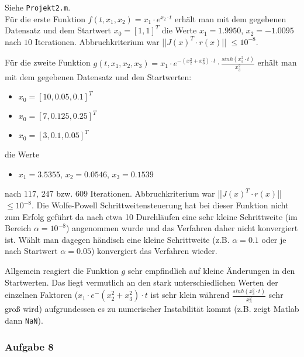 \documentclass[a4paper, 12pt]{report}
\begin{document}
Siehe \lstinline[basicstyle=\ttfamily\color{black}]|Projekt2.m|.\\
Für die erste Funktion $f(t, x_1, x_2) = x_1\cdot e^{x_2\cdot t}$ erhält man mit dem gegebenen Datensatz und dem
Startwert $x_0 = [1, 1]^T$ die Werte $x_1 = 1.9950$, $x_2 = -1.0095$ nach $10$ Iterationen. Abbruchkriterium war
||$J(x)^T\cdot r(x)$|| $ \leq 10^{-8}$.\par
Für die zweite Funktion $g(t, x_1, x_2, x_3) = x_1 \cdot e^{ -(x_2^2 + x_3^2)\cdot t }\cdot \frac{sinh(x_3^2\cdot t)}{x_3^2}$
erhält man mit dem gegebenen Datensatz und den Startwerten:
\begin{itemize}
  \item $x_0 = [10, 0.05, 0.1]^T$
  \item $x_0 = [7, 0.125, 0.25]^T$
  \item $x_0 = [3, 0.1, 0.05]^T$
\end{itemize}
die Werte
\begin{itemize}
  \item $x_1 = 3.5355$, $x_2 = 0.0546$, $x_3 = 0.1539$
\end{itemize}
nach $117$, $247$ bzw. $609$ Iterationen. Abbruchkriterium war ||$J(x)^T\cdot r(x)$|| $ \leq 10^{-8}$. Die Wolfe-Powell
Schrittweitensteuerung hat bei dieser Funktion nicht zum Erfolg geführt da nach etwa 10 Durchläufen eine sehr kleine
Schrittweite (im Bereich $\alpha = 10^{-8}$) angenommen wurde und das Verfahren daher nicht konvergiert ist. Wählt
man dagegen händisch eine kleine Schrittweite (z.B. $\alpha = 0.1$ oder je nach Startwert $\alpha = 0.05$) konvergiert das
Verfahren wieder.\par
Allgemein reagiert die Funktion $g$ sehr empfindlich auf kleine Änderungen in den Startwerten. Das liegt vermutlich an den
stark unterschiedlichen Werten der einzelnen Faktoren ($x_1\cdot e^-{ (x_2^2 + x_3^2)\cdot t}$ ist sehr klein während
$\frac{sinh(x_3^2\cdot t)}{x_3^2}$ sehr groß wird) aufgrundessen es zu numerischer Instabilität kommt (z.B. zeigt Matlab
dann \lstinline[basicstyle=\ttfamily\color{black}]|NaN|).


\subsubsection{Aufgabe 8}
\end{document}
